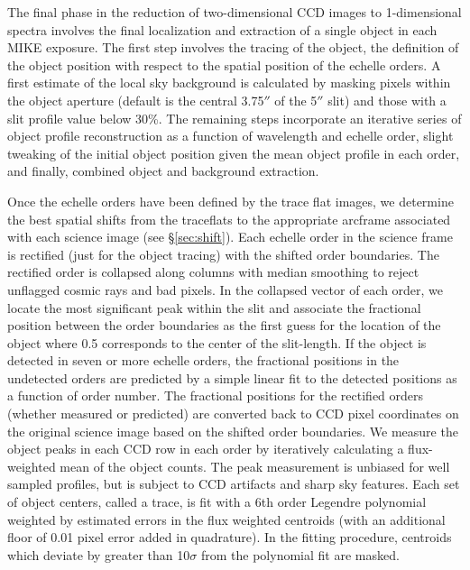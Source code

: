 \documentclass[]{emulateapj}
\begin{document}
The final phase in the reduction of two-dimensional CCD images
to 1-dimensional spectra involves the final localization and extraction
of a single object in each MIKE exposure.  The first step involves the tracing
of the object, the definition of the object position with respect to
the spatial position of the echelle orders.  
A first estimate of the local sky background is 
calculated by masking pixels within the object aperture 
(default is the central 3.75$''$ of the 5$''$ slit) and those with
a slit profile value below 30\%.
The remaining steps incorporate an iterative series of 
object profile reconstruction as a function of wavelength and echelle order, 
slight tweaking of the initial object position given the mean 
object profile in each order, and finally, combined object and background
extraction.

Once the echelle orders have been defined by the trace flat images, we determine
the best spatial shifts from the traceflats to the appropriate arcframe
associated with each science image (see \S\ref{sec:shift}).  
Each echelle order in the science frame
is rectified (just for the object tracing) with the shifted order boundaries.
The rectified order is collapsed along columns with median smoothing to reject
unflagged cosmic rays and bad pixels.  In the collapsed vector of each order, 
we locate the most significant peak within the slit
and associate the fractional position 
between the order boundaries as the first guess for the location of 
the object where 0.5 corresponds to the center of the slit-length.
If the object is detected in seven or more echelle
orders, the fractional positions in the undetected orders 
are predicted by a simple linear fit to the detected positions
as a function of order number.  The fractional positions 
for the rectified orders (whether measured
or predicted) are converted back to CCD pixel coordinates on the original 
science image based on the shifted order boundaries.  We measure the object 
peaks in each CCD row in each order by iteratively calculating a flux-weighted
mean of the object counts.  The peak measurement is unbiased for well sampled
profiles, but is subject to CCD artifacts and sharp sky features.  Each
set of object centers, called a trace, 
is fit with a 6th order Legendre polynomial
weighted by estimated errors in the flux weighted centroids (with an additional
floor of 0.01 pixel error added in quadrature).  In the fitting procedure,
centroids which deviate by greater than 10$\sigma$ from the polynomial fit
are masked.  
\end{document}
